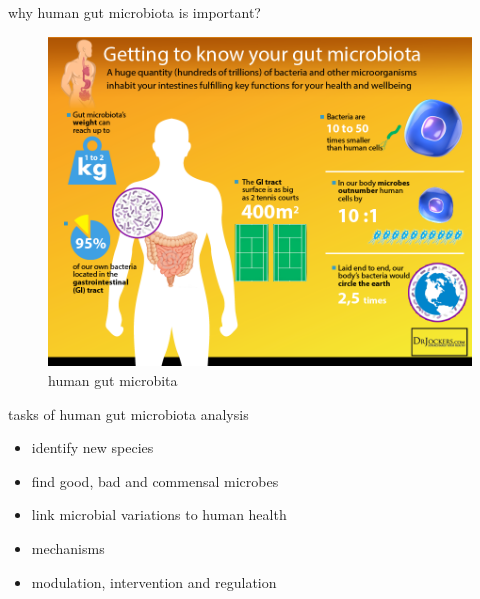 \documentclass[ignorenonframetext,]{beamer}
\providecommand{\tightlist}{%
  \setlength{\itemsep}{0pt}\setlength{\parskip}{0pt}}
\begin{document}
\begin{frame}{why human gut microbiota is important?}
\protect\hypertarget{why-human-gut-microbiota-is-important}{}
\begin{figure}
\centering
\includegraphics[width=\textwidth,height=0.6\textheight]{images/talk06/GutMicrobeInfographic.png}
\caption{human gut microbita}
\end{figure}
\end{frame}

\begin{frame}{tasks of human gut microbiota analysis}
\protect\hypertarget{tasks-of-human-gut-microbiota-analysis}{}
\begin{itemize}
\tightlist
\item
  identify new species
\item
  find good, bad and commensal microbes
\item
  link microbial variations to human health
\item
  mechanisms
\item
  modulation, intervention and regulation
\end{itemize}
\end{frame}
\end{document}
